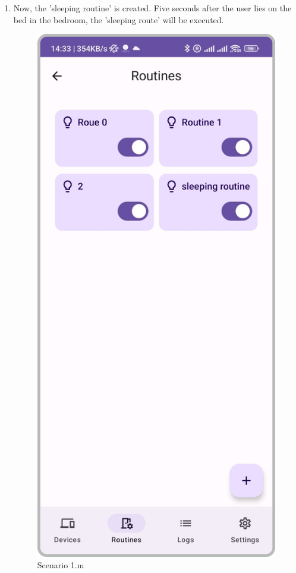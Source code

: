 \begin{enumerate}
\begin{enumerate}
              \item Now, the 'sleeping routine' is created. Five seconds after the user lies on the bed in the bedroom, the 'sleeping route' will be executed.\\
                    \begin{figure}[hbt!]
                        \centering
                        \includegraphics[width=0.5\linewidth]{imgs/usercase/usercase_scenario1_13.png}
                        \caption{Scenario 1.m}                        
                    \end{figure}
          \end{enumerate}
          \newpage


\end{enumerate}
